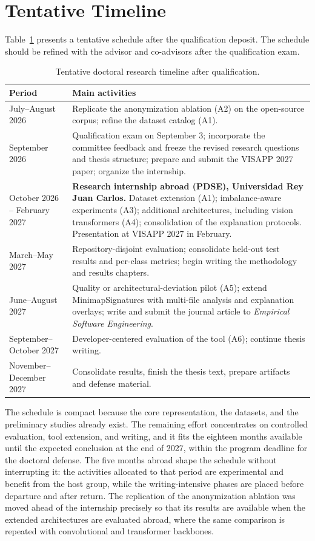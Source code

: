 \section{Tentative Timeline}

Table~\ref{tab:timeline} presents a tentative schedule after the qualification
deposit. The schedule should be refined with the advisor and co-advisors after
the qualification exam.

\begin{table}[ht]
\centering
\caption{Tentative doctoral research timeline after qualification.}
\label{tab:timeline}
\begin{tabular}{p{}p{}}
\toprule
\textbf{Period} & \textbf{Main activities} \\
\midrule
July--August 2026 & Replicate the anonymization ablation (A2) on the open-source corpus; refine the dataset catalog (A1). \\
September 2026 & Qualification exam on September 3; incorporate the committee feedback and freeze the revised research questions and thesis structure; prepare and submit the VISAPP 2027 paper; organize the internship. \\
October 2026 -- February 2027 & \textbf{Research internship abroad (PDSE), Universidad Rey Juan Carlos.} Dataset extension (A1); imbalance-aware experiments (A3); additional architectures, including vision transformers (A4); consolidation of the explanation protocols. Presentation at VISAPP 2027 in February. \\
March--May 2027 & Repository-disjoint evaluation; consolidate held-out test results and per-class metrics; begin writing the methodology and results chapters. \\
June--August 2027 & Quality or architectural-deviation pilot (A5); extend MinimapSignatures with multi-file analysis and explanation overlays; write and submit the journal article to \emph{Empirical Software Engineering}. \\
September--October 2027 & Developer-centered evaluation of the tool (A6); continue thesis writing. \\
November--December 2027 & Consolidate results, finish the thesis text, prepare artifacts and defense material. \\
\bottomrule
\end{tabular}
\fautor
\end{table}

The schedule is compact because the core representation, the datasets, and the
preliminary studies already exist. The remaining effort concentrates on
controlled evaluation, tool extension, and writing, and it fits the eighteen
months available until the expected conclusion at the end of 2027, within the
program deadline for the doctoral defense. The five months abroad shape the
schedule without interrupting it: the activities
allocated to that period are experimental and benefit from the host group, while
the writing-intensive phases are placed before departure and after return. The
replication of the anonymization ablation was moved ahead of the internship
precisely so that its results are available when the extended architectures are
evaluated abroad, where the same comparison is repeated with convolutional and
transformer backbones.
